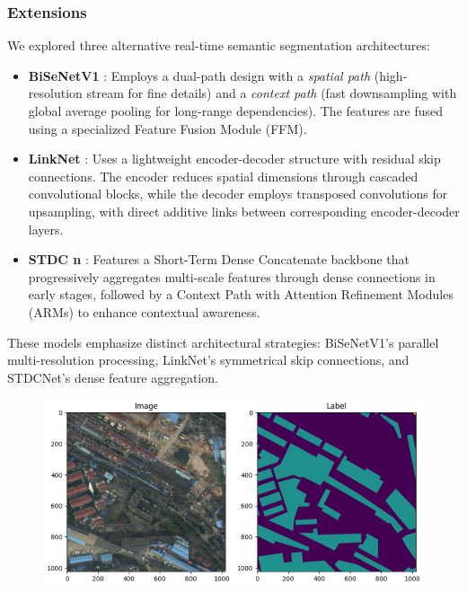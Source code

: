 \documentclass{article}
\begin{document}
\begin{multicols}{2}
		\subsubsection{Extensions}
		We explored three alternative real-time semantic segmentation architectures:
		\begin{itemize}
			\item \textbf{BiSeNetV1} \cite{yu2018bisenet}: Employs a dual-path design with a \textit{spatial path} (high-resolution stream for fine details) and a \textit{context path} (fast downsampling with global average pooling for long-range dependencies). The features are fused using a specialized Feature Fusion Module (FFM).
			\item \textbf{LinkNet} \cite{chaurasia2017linknet}: Uses a lightweight encoder-decoder structure with residual skip connections. The encoder reduces spatial dimensions through cascaded convolutional blocks, while the decoder employs transposed convolutions for upsampling, with direct additive links between corresponding encoder-decoder layers.
			\item \textbf{STDC n} \cite{fan2021rethinking}: Features a Short-Term Dense Concatenate backbone that progressively aggregates multi-scale features through dense connections in early stages, followed by a Context Path with Attention Refinement Modules (ARMs) to enhance contextual awareness.
		\end{itemize}
		These models emphasize distinct architectural strategies: BiSeNetV1's parallel multi-resolution processing, LinkNet's symmetrical skip connections, and STDCNet's dense feature aggregation.
		

		\begin{figure}[H]  

			\centering
			\begin{minipage}{1\linewidth}
				\centering
				\includegraphics[width=1\linewidth]{image/urban+mask4.png}
				

\end{minipage}
\end{figure}
\end{multicols}
\end{document}
